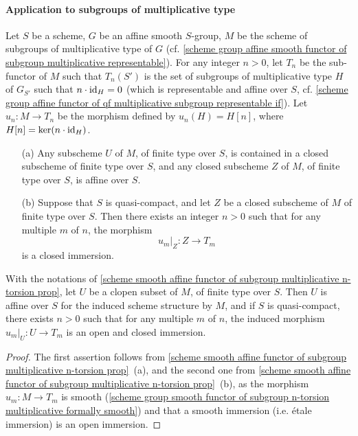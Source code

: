 \paragraph{Application to subgroups of multiplicative type}\label{scheme group smooth affine subgroup multplicative application paragraph}
\begin{theorem}\label{scheme smooth affine functor of subgroup multiplicative n-torsion prop}
Let $S$ be a scheme, $G$ be an affine smooth $S$-group, $M$ be the scheme of subgroups of multiplicative type of $G$ (cf. \cref{scheme group affine smooth functor of subgroup multiplicative representable}). For any integer $n>0$, let $T_n$ be the sub-functor of $M$ such that $T_n(S')$ is the set of subgroups of multiplicative type $H$ of $G_{S'}$ such that $n\cdot\operatorname{id}_H=0$ (which is representable and affine over $S$, cf. \cref{scheme group affine functor of qf multiplicative subgroup representable if}). Let $u_n:M\to T_n$ be the morphism defined by $u_n(H)=H[n]$, where $H[n]=\operatorname{ker}(n\cdot\operatorname{id}_H)$.
\begin{enumerate}
    \item[(a)] Any subscheme $U$ of $M$, of finite type over $S$, is contained in a closed subscheme of finite type over $S$, and any closed subscheme $Z$ of $M$, of finite type over $S$, is affine over $S$.
    \item[(b)] Suppose that $S$ is quasi-compact, and let $Z$ be a closed subscheme of $M$ of finite type over $S$. Then there exists an integer $n>0$ such that for any multiple $m$ of $n$, the morphism
    \[u_m|_Z:Z\to T_m\]
    is a closed immersion. 
\end{enumerate}
\end{theorem}

\begin{corollary}\label{scheme smooth affine functor of subgroup multiplicative clopen subscheme prop}
With the notations of \cref{scheme smooth affine functor of subgroup multiplicative n-torsion prop}, let $U$ be a clopen subset of $M$, of finite type over $S$. Then $U$ is affine over $S$ for the induced scheme structure by $M$, and if $S$ is quasi-compact, there exists $n>0$ such that for any multiple $m$ of $n$, the induced morphism $u_m|_U:U\to T_m$ is an open and closed immersion.
\end{corollary}
\begin{proof}
The first assertion follows from \cref{scheme smooth affine functor of subgroup multiplicative n-torsion prop}~(a), and the second one from \cref{scheme smooth affine functor of subgroup multiplicative n-torsion prop}~(b), as the morphism $u_m:M\to T_m$ is smooth (\cref{scheme group smooth functor of subgroup n-torsion multiplicative formally smooth}) and that a smooth immersion (i.e. \'etale immersion) is an open immersion.
\end{proof}

